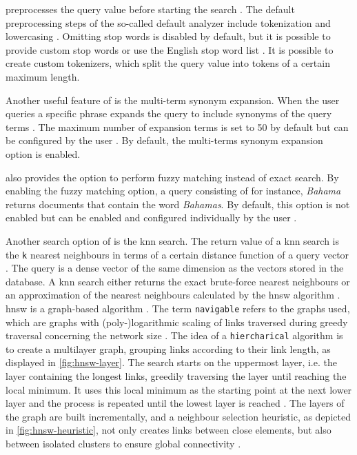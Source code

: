 \databaseName{} preprocesses the query value before starting the search \cite{Elasticsearch-text-analyser}.
The default preprocessing steps of the so-called default analyzer include tokenization and lowercasing \cite{Elasticsearch-text-analyser}. 
Omitting stop words is disabled by default, but it is possible to provide custom stop words or use the English stop word list \cite{Elasticsearch-text-analyser}.
It is possible to create custom tokenizers, which split the query value into tokens of a certain maximum length.

Another useful feature of \databaseName{} is the multi-term synonym expansion.
When the user queries a specific phrase \databaseName{} expands the query to include synonyms of the query terms \cite{Elasticsearch-synonyms}.
The maximum number of expansion terms is set to 50 by default but can be configured by the user \cite{Elasticsearch-match}.
By default, the multi-terms synonym expansion option is enabled.

\databaseName{} also provides the option to perform fuzzy matching instead of exact search.
By enabling the fuzzy matching option, a \databaseName{} query consisting of for instance, \textit{Bahama} returns documents that contain the word \textit{Bahamas}.
By default, this option is not enabled but can be enabled and configured individually by the user \cite{Elasticsearch-match}.


Another search option of \databaseName{} is the \ac{knn} search.
The return value of a \ac{knn} search is the \texttt{k} nearest neighbours in terms of a certain distance function of a query vector \cite{Elasticsearch-kNN-HNSW}.
The query is a dense vector of the same dimension as the vectors stored in the database.
A \ac{knn} search either returns the exact brute-force nearest neighbours or 
an approximation of the nearest neighbours calculated by the \ac{hnsw} algorithm \cite{Elasticsearch-kNN-HNSW, Elasticsearch-knn}.
\ac{hnsw} is a graph-based algorithm \cite{Elasticsearch-kNN-HNSW}.
The term \texttt{navigable} refers to the graphs used, which are graphs with (poly-)logarithmic scaling of links traversed during greedy traversal concerning the network size \cite{Elasticsearch-kNN-HNSW}.
The idea of a \texttt{hiercharical} algorithm is to create a multilayer graph, grouping links according to their link length, as displayed in \autoref{fig:hnsw-layer}. 
The search starts on the uppermost layer, i.e. the layer containing the longest links, greedily traversing the layer until reaching the local minimum.
It uses this local minimum as the starting point at the next lower layer and the process is repeated until the lowest layer is reached \cite{Elasticsearch-kNN-HNSW}.
The layers of the graph are built incrementally, and a neighbour selection heuristic, as depicted in \autoref{fig:hnsw-heuristic}, not only creates links between close elements, 
but also between isolated clusters to ensure global connectivity \cite{Elasticsearch-kNN-HNSW}.


